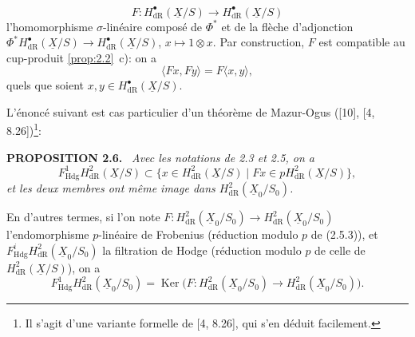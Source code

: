 \documentclass[10pt]{article}
\makeatletter
\DeclareMathOperator{\Ker}{Ker}
\newcommand{\Hdg}{\mathrm{Hdg}}
\newcommand{\UX}{\underline{X}}
\newcommand{\sourceanchor}[2]{\begingroup\def\@currentlabel{#2}\label{#1}\endgroup}
\newenvironment{sourcestatement}[3]{\par\smallskip\noindent\textbf{#1 #2.}\sourceanchor{#3}{#2}\ \itshape}{\par\normalfont\smallskip}
\makeatother
\begin{document}
\begin{equation}\tag{2.5.3}\label{eq:2.5.3}
F: H^{\bullet}_{\mathrm{dR}}(\UX/S) \to H^{\bullet}_{\mathrm{dR}}(\UX/S)
\end{equation}
l'homomorphisme $\sigma$-linéaire composé de $\Phi^*$ et de la flèche d'adjonction $\Phi^* H^{\bullet}_{\mathrm{dR}}(\UX/S) \to H^{\bullet}_{\mathrm{dR}}(\UX/S)$, $x \mapsto 1 \otimes x$. Par construction, $F$ est compatible au cup-produit \ref{prop:2.2}~c): on a
\begin{equation}\tag{2.5.4}\label{eq:2.5.4}
\langle Fx, Fy \rangle = F\langle x, y \rangle,
\end{equation}
quels que soient $x, y \in H^{\bullet}_{\mathrm{dR}}(\UX/S)$.

\medskip
L'énoncé suivant est cas particulier d'un théorème de Mazur-Ogus ([10], [4, 8.26])\footnote{Il s'agit d'une variante formelle de [4, 8.26], qui s'en déduit facilement.}:

\begin{sourcestatement}{PROPOSITION}{2.6}{prop:2.6}
Avec les notations de 2.3 et 2.5, on a
\[
F^1_{\Hdg}H^2_{\mathrm{dR}}(\UX/S)
\subset \{x\in H^2_{\mathrm{dR}}(\UX/S)\mid Fx\in pH^2_{\mathrm{dR}}(\UX/S)\},
\]
et les deux membres ont même image dans $H^2_{\mathrm{dR}}(\UX_0/S_0)$.
\end{sourcestatement}

En d'autres termes, si l'on note $F:H^2_{\mathrm{dR}}(\UX_0/S_0)\to H^2_{\mathrm{dR}}(\UX_0/S_0)$ l'endomorphisme $p$-linéaire de Frobenius (réduction modulo $p$ de (2.5.3)), et $F^i_{\Hdg}H^2_{\mathrm{dR}}(\UX_0/S_0)$ la filtration de Hodge (réduction modulo $p$ de celle de $H^2_{\mathrm{dR}}(\UX/S)$), on a
\begin{equation}\tag{2.6.1}\label{eq:2.6.1}
F^1_{\Hdg}H^2_{\mathrm{dR}}(\UX_0/S_0)
=\Ker\bigl(F:H^2_{\mathrm{dR}}(\UX_0/S_0)\to H^2_{\mathrm{dR}}(\UX_0/S_0)\bigr).
\end{equation}
\end{document}
